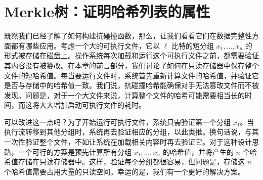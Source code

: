 \section{Merkle树：证明哈希列表的属性}\label{sec:8-9}

既然我们已经了解了如何构建抗碰撞函数，那么，让我们看看它们在数据完整性方面都有哪些应用。考虑一个大的可执行文件，它以 $\ell$ 比特的短分组 $x_1,\dots,x_n$ 的形式被存储在磁盘上。操作系统每次加载和运行这个可执行文件之前，都需要验证其内容没有被篡改。在本章的前言部分，我们讨论了如何在只读存储器中保存整个文件的短哈希值\footnotemark[3]。每当要运行文件时，系统首先重新计算文件的哈希值，并验证它是否与存储中的哈希值一致。我们说，抗碰撞哈希能确保对手无法篡改文件而不被发现。问题是，对于一个大文件来说，计算整个文件的哈希可能需要相当长的时间，而这将大大增加启动可执行文件的耗时。


可以改进这一点吗？为了开始运行可执行文件，系统只需验证第一个分组 $x_1$。当执行流转移到其他分组时，系统再去验证相应的分组，以此类推。换句话说，与其一次性验证整个文件，不如让系统在加载相关内容时再去验证它。对于这种设计思路，一个可行的方案是预先计算所有分组 $x_1,\dots,x_n$ 的哈希值，并将产生的 $n$ 个哈希值存储在只读存储器中。这样，验证每个分组都很容易，但问题是，存储这 $n$ 个哈希值需要占用大量的只读空间。幸运的是，我们有一个更好的解决方案。

